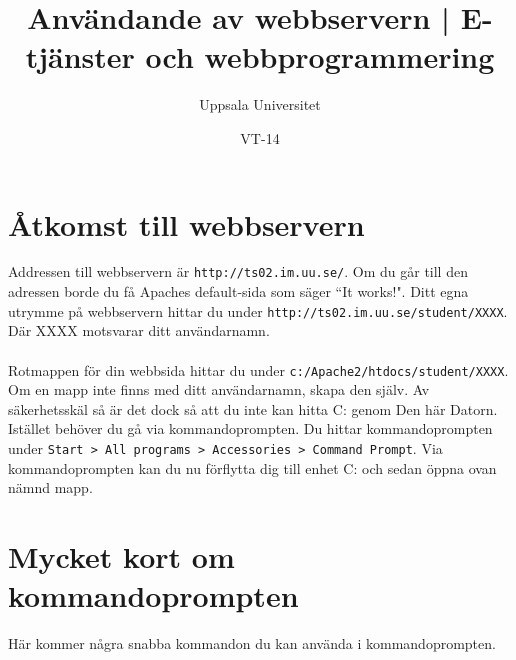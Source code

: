 \documentclass{article}
\begin{document}
  \title{ Användande av webbservern | E-tjänster och webbprogrammering }
  \author{ Uppsala Universitet }
  \date{ VT-14 }
  \maketitle

  \lstset{language=PHP}

  \section{Åtkomst till webbservern}
    Addressen till webbservern är \texttt{http://ts02.im.uu.se/}. Om du går till den adressen borde du få Apaches default-sida som säger ``It works!". Ditt egna utrymme på webbservern hittar du under \texttt{http://ts02.im.uu.se/student/XXXX}. Där XXXX motsvarar ditt användarnamn.

  \paragraph{}
    Rotmappen för din webbsida hittar du under \texttt{c:/Apache2/htdocs/student/XXXX}. Om en mapp inte finns med ditt användarnamn, skapa den själv. Av säkerhetsskäl så är det dock så att du inte kan hitta C: genom Den här Datorn. Istället behöver du gå via kommandoprompten. Du hittar kommandoprompten under \texttt{Start > All programs > Accessories > Command Prompt}. Via kommandoprompten kan du nu förflytta dig till enhet C: och sedan öppna ovan nämnd mapp.

  \section{Mycket kort om kommandoprompten}
    Här kommer några snabba kommandon du kan använda i kommandoprompten.
\end{document}
